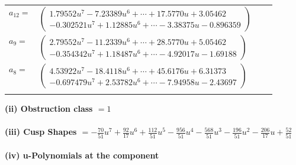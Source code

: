 \documentclass[1p]{elsarticle_modified}
\theoremstyle{definition}
\begin{document}
\begin{tabular}{m{7pt} m{180pt} m{7pt} m{180pt} }
\flushright $a_{12}=$&$\begin{pmatrix}1.79552 u^{7}-7.23389 u^{6}+\cdots+17.5770 u+3.05462\\-0.302521 u^{7}+1.12885 u^{6}+\cdots-3.38375 u-0.896359\end{pmatrix}$ \\
\flushright $a_{9}=$&$\begin{pmatrix}2.79552 u^{7}-11.2339 u^{6}+\cdots+28.5770 u+5.05462\\-0.354342 u^{7}+1.18487 u^{6}+\cdots-4.92017 u-1.69188\end{pmatrix}$ \\
\flushright $a_{8}=$&$\begin{pmatrix}4.53922 u^{7}-18.4118 u^{6}+\cdots+45.6176 u+6.31373\\-0.697479 u^{7}+2.53782 u^{6}+\cdots-7.94958 u-2.43697\end{pmatrix}$\\&\end{tabular}
\flushleft \textbf{(ii) Obstruction class $= 1$}\\~\\
\flushleft \textbf{(iii) Cusp Shapes $= -\frac{70}{51} u^7+\frac{92}{17} u^6+\frac{112}{51} u^5-\frac{956}{51} u^4-\frac{568}{51} u^3-\frac{196}{51} u^2-\frac{206}{17} u+\frac{52}{51}$}\\~\\
\newpage\renewcommand{\arraystretch}{1}
\flushleft \textbf{(iv) u-Polynomials at the component}\newline \\
\end{document}
